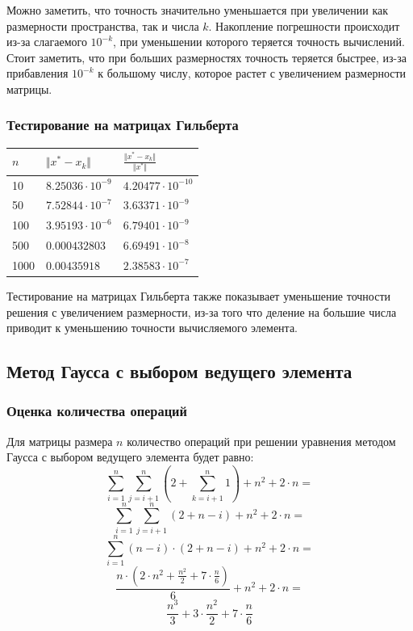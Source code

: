 \documentclass[english]{article}
\begin{document}
Можно заметить, что точность значительно уменьшается при увеличении
как размерности пространства, так и числа \(k\). Накопление
погрешности происходит из-за слагаемого \(10^{-k}\), при уменьшении
которого теряется точность вычислений. Стоит заметить, что при больших
размерностях точность теряется быстрее, из-за прибавления \(10^{-k}\)
к большому числу, которое растет с увеличением размерности матрицы.

\subsubsection{Тестирование на матрицах Гильберта}
\begin{center}
  \begin{longtable}{l|l|l}
    \(n\) & \(\Vert x^* - x_k \Vert\) & \(\frac{\Vert x^* - x_k \Vert}{\Vert x^* \Vert}\) \\
    \hline
    10 & \(8.25036\cdot 10^{-9}\) & \(4.20477\cdot 10^{-10}\) \\
    50 & \(7.52844\cdot 10^{-7}\) & \(3.63371\cdot 10^{-9}\) \\
    100 & \(3.95193\cdot 10^{-6}\) & \(6.79401\cdot 10^{-9}\) \\
    500 & \(0.000432803\) & \(6.69491\cdot 10^{-8}\) \\
    1000 & \(0.00435918 \) & \(2.38583\cdot 10^{-7}\)
  \end{longtable}
\end{center}

Тестирование на матрицах Гильберта также показывает уменьшение
точности решения с увеличением размерности, из-за того что деление на
большие числа приводит к уменьшению точности вычисляемого элемента.

\subsection{Метод Гаусса с выбором ведущего элемента}
\subsubsection{Оценка количества операций}
Для матрицы размера \(n\) количество операций при решении уравнения методом Гаусса с выбором ведущего элемента будет равно:
\[ \sum_{i=1}^{n} \sum_{j=i + 1}^{n} (2 + \sum_{k=i+1}^{n} 1) + n^2 + 2\cdot n =\]
\[ \sum_{i=1}^{n} \sum_{j=i + 1}^{n} (2 + n - i) + n^2 + 2\cdot n =\]
\[ \sum_{i=1}^{n} (n - i)\cdot (2 + n - i) + n^2 + 2\cdot n =\]
\[ \frac{n \cdot (2 \cdot n^2 + \frac{n^2}{2} + 7 \cdot \frac{n}{6})}{6} + n^2 + 2 \cdot n =\]
\[ \frac{n^3}{3} + 3 \cdot \frac{n^2}{2} + 7 \cdot \frac{n}{6}\]
\end{document}
